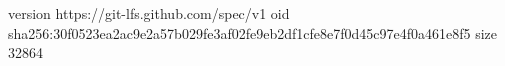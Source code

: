 version https://git-lfs.github.com/spec/v1
oid sha256:30f0523ea2ac9e2a57b029fe3af02fe9eb2df1cfe8e7f0d45c97e4f0a461e8f5
size 32864
